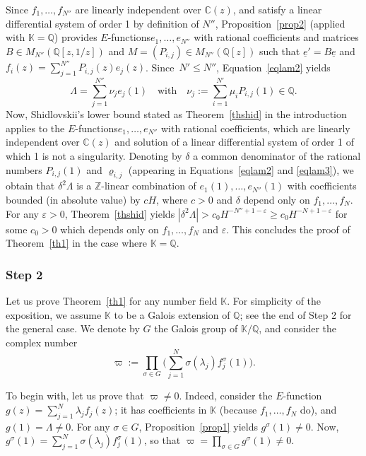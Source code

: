 \documentclass[JEP,XML,SOM,Unicode,published]{cedram}
\newcommand{\Efunction}{$E$\nobreakdash-func\-tion\xspace}
\newcommand{\Efunctions}{$E$\nobreakdash-func\-tions\xspace}
\theoremstyle{definition}
\newcommand{\Z}{\mathbb{Z}}
\newcommand{\Q}{\mathbb{Q}}
\newcommand{\C}{\mathbb{C}}
\newcommand{\K}{\mathbb{K}}
\let\eps\varepsilon
\begin{document}
Since $f_1,\ldots,f_{N''}$ are linearly independent over $\C(z)$, and satisfy a linear differential system of order 1 by definition of $N''$, Proposition~\ref{prop2} (applied with $\mathbb K=\mathbb Q$) provides \Efunctions $e_1,\ldots,e_{N''}$ with rational coefficients and matrices $B\in M_{N''}(\Q[z,1/z])$ and $M = (P_{i,j})\in M_{N''}(\Q[z])$ such that $\underline e' = B \underline e$ and $f_i(z) = \sum_{j=1}^{N''} P_{i,j}(z)e_j(z)$. Since~$N'\leq N''$, Equation~\eqref{eqlam2} yields
\begin{equation}\label{eqlam3}
\Lambda = \sum_{j=1}^{N''} \nu_j e_j(1) \quad \mbox{with} \quad
\nu_j := \sum_{i=1}^{N'} \mu_i P_{i,j}(1)\in\Q.
\end{equation}
Now, Shidlovskii's lower bound stated as Theorem~\ref{thshid} in the introduction
applies to the \Efunctions $e_1,\ldots,e_{N''}$ with rational coefficients, which are linearly independent over $\C(z)$ and solution of a linear differential system of order 1 of which 1 is not a singularity. Denoting by $\delta$ a common denominator of the rational numbers $P_{i,j}(1)$ and $\varrho_{i,j} $ (appearing in Equations~\eqref{eqlam2} and \eqref{eqlam3}), we obtain that $\delta^2 \Lambda $ is a $\Z$-linear combination of $e_1(1),\ldots,e_{N''}(1)$ with coefficients bounded (in absolute value) by $cH$, where $c>0$ and $\delta$ depend only on $f_1,\ldots,f_N$. For any $\eps>0$, Theorem~\ref{thshid} yields $ |\delta^2 \Lambda |>c_0 H^{-N''+1-\eps}\geq c_0 H^{-N+1-\eps}$ for some $c_0>0$ which depends only on $f_1,\ldots,f_N$ and $\eps$. This concludes the proof of Theorem~\ref{th1} in the case where $\K=\Q$.

\subsubsection*{Step 2}
Let us prove Theorem~\ref{th1} for any number field $\K$. For simplicity of the exposition, we assume $\K$ to be a Galois extension of $\Q$; see the end of Step 2 for the general case. We denote by $G$ the Galois group of $\K/\Q$, and consider the complex number
\begin{equation} \label{eqdefvarpi}
\varpi := \prod_{\sigma\in G} \Big( \sum_{j=1}^N \sigma(\lambda_j) f_j^\sigma(1)\Big).
\end{equation}

To begin with, let us prove that $ \varpi \neq 0$. Indeed, consider the \Efunction $g(z) = \sum_{j=1}^N \lambda_j f_j(z)$; it has coefficients in $\K$ (because $f_1,\ldots,f_N$ do), and $g(1) = \Lambda\neq 0$. For any $\sigma \in G$, Proposition~\ref{prop1} yields $g^\sigma(1) \neq 0$. Now, $g^\sigma(1) = \sum_{j=1}^N \sigma(\lambda_j) f_j^\sigma(1)$, so that $\varpi = \prod_{\sigma\in G} g^\sigma(1) \neq 0$.
\end{document}
